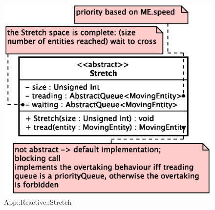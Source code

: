 \begin{figure}[h]
\centering
\includegraphics[scale=0.6,keepaspectratio]{images/solution/stretch.eps}
\caption{App::Reactive::Stretch}
\label{fig:sd-app-stretch}
\end{figure}
\FloatBarrier
